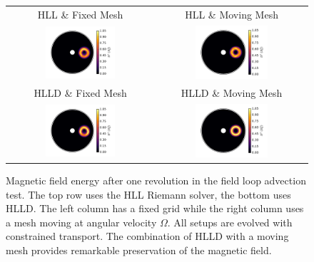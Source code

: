 \begin{figure}
\begin{center}
\begin{tabular}{cc}
	HLL \& Fixed Mesh & HLL \& Moving Mesh \\
	\includegraphics[width=0.5\textwidth]{figures/numerics/floop_hlle_fix.png} & \includegraphics[width=0.5\textwidth]{figures/numerics/floop_hlle_mov.png} \\
	HLLD \& Fixed Mesh & HLLD \& Moving Mesh \\
	\includegraphics[width=0.5\textwidth]{figures/numerics/floop_hlld_fix.png} & \includegraphics[width=0.5\textwidth]{figures/numerics/floop_hlld_mov.png} 
\end{tabular}
\end{center}
\caption{Magnetic field energy after one revolution in the field loop advection test.  The top row uses the HLL Riemann solver, the bottom uses HLLD.  The left column has a fixed grid while the right column uses a mesh moving at angular velocity $\Omega$.  All setups are evolved with constrained transport. The combination of HLLD with a moving mesh provides remarkable preservation of the magnetic field.  }
\end{figure}

